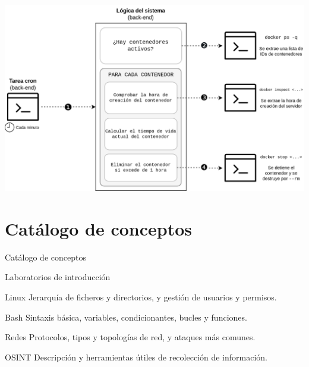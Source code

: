     \begin{frame}
        \centering

        \includegraphics[scale=0.15]{images/diagramas/cron.png}
    \end{frame}


\section{Catálogo de conceptos}

    \begin{frame}
        \Huge{\centerline{Catálogo de conceptos}}
    \end{frame}

    \begin{frame}{Laboratorios de introducción}
        \begin{block}{Linux}
            Jerarquía de ficheros y directorios, y gestión de usuarios y permisos.
        \end{block}
        \begin{block}{Bash}
            Sintaxis básica, variables, condicionantes, bucles y funciones.
        \end{block}

        \begin{block}{Redes}
            Protocolos, tipos y topologías de red, y ataques más comunes.
        \end{block}

        \begin{block}{OSINT}
            Descripción y herramientas útiles de recolección de información.
        \end{block}
    \end{frame}
    
